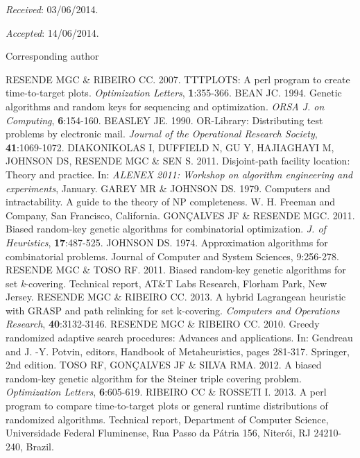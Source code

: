 \medskip\par\noindent
\footnotesize{\textit{Received}: 03/06/2014.} \par \noindent
\footnotesize{\textit{Accepted}: 14/06/2014.} \medskip\par\noindent
\footnotesize{Corresponding author}
\balance
\pagebreak\onecolumn
\begin{biblio}[REFERENCES]
 RESENDE MGC \& RIBEIRO CC. 2007. TTTPLOTS: A perl program to create time-to-target plots. \textit{Optimization Letters}, \textbf{1}:355-366.
\tit{ }BEAN JC. 1994. Genetic algorithms and random keys for sequencing and optimization. \textit{ORSA J. on Computing}, \textbf{6}:154-160.
\tit{ }BEASLEY JE. 1990. OR-Library: Distributing test problems by electronic mail. \textit{Journal of the Operational Research Society}, \textbf{41}:1069-1072.
 DIAKONIKOLAS I, DUFFIELD N, GU Y, HAJIAGHAYI M, JOHNSON DS, RESENDE MGC \& SEN S. 2011. Disjoint-path facility location: Theory and practice. In: \textit{ALENEX 2011: Workshop on algorithm engineering and experiments}, January.
\tit{ }GAREY MR \& JOHNSON DS. 1979. Computers and intractability. A guide to the theory of NP completeness. W. H. Freeman and Company, San Francisco, California.
\tit{ }GONÇALVES JF \& RESENDE MGC. 2011. Biased random-key genetic algorithms for combinatorial optimization. \textit{J. of Heuristics}, \textbf{17}:487-525.
\tit{ }JOHNSON DS. 1974. Approximation algorithms for combinatorial problems. Journal of Computer and System Sciences, 9:256-278.
 RESENDE MGC \& TOSO RF. 2011. Biased random-key genetic algorithms for set \textit{k}-covering. Technical report, AT\&T Labs Research, Florham Park, New Jersey.
 RESENDE MGC \& RIBEIRO CC. 2013. A hybrid Lagrangean heuristic with GRASP and path relinking for set k-covering. \textit{Computers and Operations Research}, \textbf{40}:3132-3146.
\tit{ }RESENDE MGC \& RIBEIRO CC. 2010. Greedy randomized adaptive search procedures: Advances and applications. In: Gendreau and J. -Y. Potvin, editors, Handbook of Metaheuristics, pages 281-317. Springer, 2nd edition.
 TOSO RF, GONÇALVES JF \& SILVA RMA. 2012. A biased random-key genetic algorithm for the Steiner triple covering problem. \textit{Optimization Letters}, \textbf{6}:605-619.
\tit{ }RIBEIRO CC \& ROSSETI I. 2013. \protect{} A perl program to compare time-to-target plots or general runtime distributions of randomized algorithms. Technical report, Department of Computer Science, Universidade Federal Fluminense, Rua Passo da Pátria 156, Niterói, RJ 24210- 240, Brazil.

\end{biblio}
